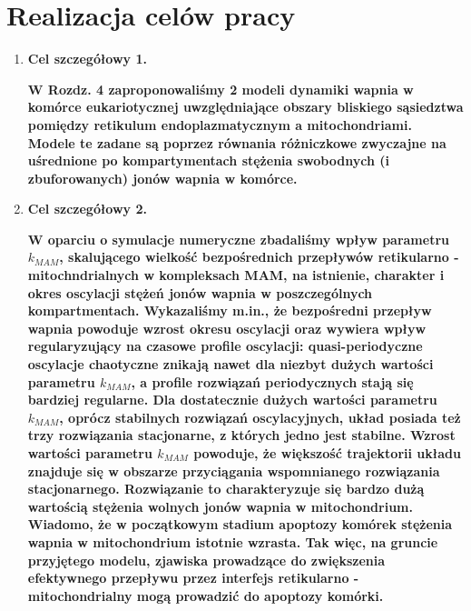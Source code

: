 \chapter{Realizacja celów pracy}
\label{chap:realizacjaCelow}
\begin{enumerate}
	\item \textbf{Cel szczegółowy 1.}
	
	\textbf{W Rozdz. 4 zaproponowaliśmy 2 modeli dynamiki wapnia w komórce eukariotycznej uwzględniające obszary bliskiego sąsiedztwa pomiędzy retikulum endoplazmatycznym a mitochondriami. Modele te zadane są poprzez równania różniczkowe zwyczajne na uśrednione po kompartymentach stężenia swobodnych (i zbuforowanych) jonów wapnia w komórce.  }
	
	\item \textbf{Cel szczegółowy 2.}
	
	\textbf{W oparciu o symulacje numeryczne zbadaliśmy wpływ parametru $k_{MAM}$, skalującego wielkość bezpośrednich przepływów retikularno - mitochndrialnych w kompleksach MAM, na istnienie, charakter i okres oscylacji stężeń jonów wapnia w poszczególnych kompartmentach.  Wykazaliśmy m.in.,  że bezpośredni przepływ wapnia powoduje wzrost okresu oscylacji oraz wywiera wpływ regularyzujący na czasowe profile oscylacji: quasi-periodyczne oscylacje chaotyczne znikają nawet dla niezbyt dużych wartości parametru $k_{MAM}$, a profile rozwiązań periodycznych stają się bardziej regularne.  Dla dostatecznie dużych wartości parametru $k_{MAM}$, oprócz stabilnych rozwiązań oscylacyjnych, układ posiada też trzy rozwiązania stacjonarne, z których jedno jest stabilne. Wzrost wartości parametru $k_{MAM}$ powoduje, że większość trajektorii układu znajduje się w obszarze przyciągania wspomnianego rozwiązania stacjonarnego.  Rozwiązanie to charakteryzuje się bardzo dużą wartością stężenia wolnych jonów wapnia w mitochondrium. Wiadomo, że w początkowym stadium apoptozy komórek stężenia wapnia w mitochondrium istotnie wzrasta. Tak więc, na gruncie przyjętego modelu, zjawiska prowadzące do zwiększenia efektywnego przepływu przez interfejs retikularno - mitochondrialny mogą prowadzić do apoptozy komórki.}
\end{enumerate}